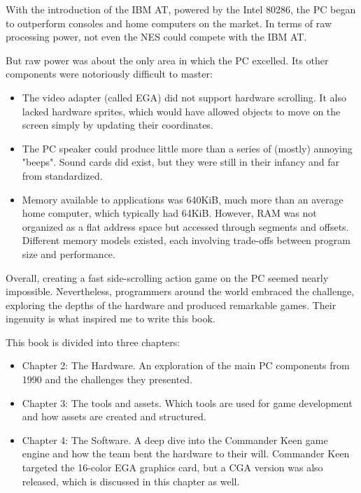 \documentclass[book.tex]{subfiles}
\begin{document}
\par
With the introduction of the IBM AT, powered by the Intel 80286, the PC began to outperform consoles and home computers on the market. In terms of raw processing power, not even the NES could compete with the IBM AT.\\



\par
But raw power was about the only area in which the PC excelled. Its other components were notoriously difficult to master:
\begin{itemize}
  \item The video adapter (called EGA) did not support hardware scrolling. It also lacked hardware sprites, which would have allowed objects to move on the screen simply by updating their  coordinates.
  \item The PC speaker could produce little more than a series of (mostly) annoying "beeps". Sound cards did exist, but they were still in their infancy and far from standardized.
  \item Memory available to applications was 640KiB, much more than an average home computer, which typically had 64KiB. However, RAM was not organized as a flat address space but accessed through segments and offsets. Different memory models existed, each involving trade-offs between program size and performance.
\end{itemize}


\par


\par
Overall, creating a fast side-scrolling action game on the PC seemed nearly impossible. Nevertheless, programmers around the world embraced the challenge, exploring the depths of the hardware and produced remarkable games. Their ingenuity is what inspired me to write this book.\\

\par
This book is divided into three chapters:
\begin{itemize}
  \item Chapter 2: The Hardware. An exploration of the main PC components from 1990 and the challenges they presented.
  \item Chapter 3: The tools and assets. Which tools are used for game development and how assets are created and structured.
  \item Chapter 4: The Software. A deep dive into the Commander Keen game engine and how the team bent the hardware to their will. Commander Keen targeted the 16-color EGA graphics card, but a CGA version was also released, which is discussed in this chapter as well.

\end{itemize}
\end{document}
